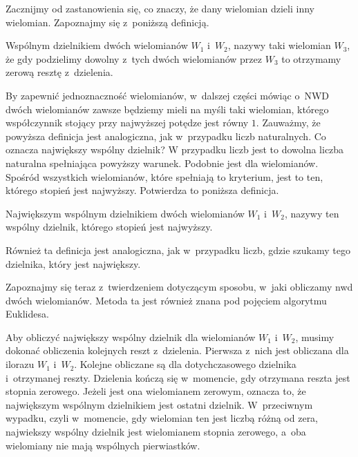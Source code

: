 Zacznijmy od zastanowienia się, co znaczy, że dany wielomian dzieli inny wielomian. Zapoznajmy się z~poniższą definicją.

\begin{definition}
	$ $\\
	Wspólnym dzielnikiem dwóch wielomianów $W_1$ i~$W_2$, nazywy taki wielomian $W_3$, że gdy podzielimy dowolny z~tych dwóch wielomianów przez $W_3$ to otrzymamy zerową resztę z~dzielenia.
\end{definition}

By zapewnić jednoznaczność wielomianów, w~dalszej części mówiąc o~NWD dwóch wielomianów zawsze będziemy mieli na myśli taki wielomian, którego współczynnik stojący przy najwyższej potędze jest równy $1$. Zauważmy, że powyższa definicja jest analogiczna, jak w~przypadku liczb naturalnych.
Co oznacza największy wspólny dzielnik? W przypadku liczb jest to dowolna liczba naturalna spełniająca powyższy warunek. Podobnie jest dla wielomianów. Spośród wszystkich wielomianów, które spełniają to kryterium, jest to ten, którego stopień jest najwyższy. Potwierdza to poniższa definicja.

\begin{definition}
	$ $\\
	Największym wspólnym dzielnikiem dwóch wielomianów $W_1$ i~$W_2$, nazywy ten wspólny dzielnik, którego stopień jest najwyższy.
\end{definition}

Również ta definicja jest analogiczna, jak w~przypadku liczb, gdzie szukamy tego dzielnika, który jest największy.

Zapoznajmy się teraz z~twierdzeniem dotyczącym sposobu, w~jaki obliczamy nwd dwóch wielomianów. Metoda ta jest również znana pod pojęciem algorytmu Euklidesa.

\begin{theorem}
	$ $\\
	Aby obliczyć największy wspólny dzielnik dla wielomianów $W_1$ i~$W_2$, musimy dokonać obliczenia kolejnych reszt z~dzielenia. Pierwsza z~nich jest obliczana dla ilorazu $W_1$ i~$W_2$. Kolejne obliczane są dla dotychczasowego dzielnika i~otrzymanej reszty. Dzielenia kończą się w~momencie, gdy otrzymana reszta jest stopnia zerowego. Jeżeli jest ona wielomianem zerowym, oznacza to, że największym wspólnym dzielnikiem jest ostatni dzielnik. W~przeciwnym wypadku, czyli w~momencie, gdy wielomian ten jest liczbą różną od zera, najwiekszy wspólny dzielnik jest wielomianem stopnia zerowego, a~oba wielomiany nie mają wspólnych pierwiastków. 
\end{theorem}

